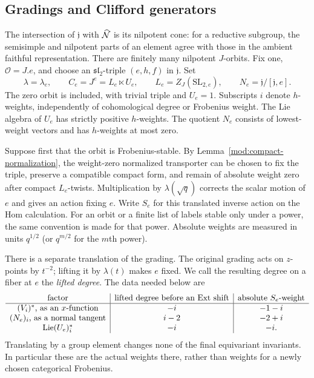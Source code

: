 \subsection{Gradings and Clifford generators}

The intersection of $\mathfrak j$ with $\widehat{\mathcal N}$ is its nilpotent cone:
for a reductive subgroup, the semisimple and nilpotent parts of an
element agree with those in the ambient faithful representation.
There are finitely many nilpotent $J$-orbits.  Fix one, $\mathcal O=J.e$,
and choose an $\mathfrak{sl}_2$-triple $(e,h,f)$ in $\mathfrak j$.
Set
\begin{equation}\label{orb:notation}
 \lambda=\lambda_e,\qquad
 C_e=J^e=L_e\ltimes U_e,\qquad
 L_e=Z_J(\mathrm{SL}_{2,e}),\qquad
 N_e=\mathfrak j/[\mathfrak j,e].
\end{equation}
The zero orbit is included, with trivial triple and $U_e=1$.
Subscripts $i$ denote $h$-weights, independently of cohomological
degree or Frobenius weight.  The Lie algebra of $U_e$ has strictly
positive $h$-weights.  The quotient $N_e$ consists of lowest-weight
vectors and has $h$-weights at most zero.

Suppose first that the orbit is Frobenius-stable.  By
Lemma~\ref{mod:compact-normalization}, the weight-zero normalized
transporter can be chosen to fix the triple, preserve a compatible
compact form, and remain of absolute weight zero after compact
$L_e$-twists.  Multiplication by $\lambda(\sqrt q)$ corrects the scalar
motion of $e$ and gives an action fixing $e$.  Write $S_e$ for this
translated inverse action on the Hom calculation.  For an orbit or a
finite list of labels stable only under a power, the same convention
is made for that power.  Absolute weights are measured in units
$q^{1/2}$ (or $q^{m/2}$ for the $m$th power).

There is a separate translation of the grading.  The original grading
acts on $z$-points by $t^{-2}$; lifting it by $\lambda(t)$ makes $e$
fixed.  We call the resulting degree on a fiber at $e$ the
\emph{lifted degree}.  The data needed below are
\begin{equation}\label{orb:weight-table}
\begin{array}{c|c|c}
 \text{factor}&\text{lifted degree before an Ext shift}
                  &\text{absolute }S_e\text{-weight}\\ \hline
 (V_i)^*\text{, as an }x\text{-function}&-i&-1-i\\
 (N_e)_i\text{, as a normal tangent}&i-2&-2+i\\
 \operatorname{Lie}(U_e)_i^*&-i&-i.
\end{array}
\end{equation}
Translating by a group element changes none of the final equivariant
invariants.  In particular these are the actual weights there, rather
than weights for a newly chosen categorical Frobenius.

